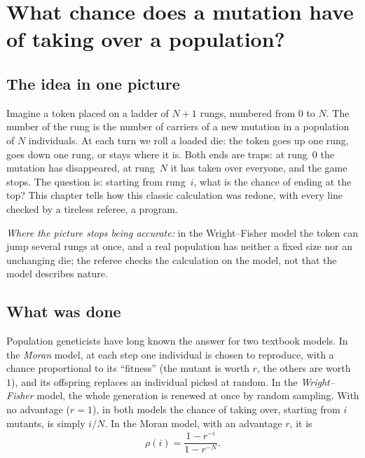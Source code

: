 \chapter[A mutation's chance of taking over]{What chance does a mutation have of taking over a population?}

\section*{The idea in one picture}

\begin{analogie}
Imagine a token placed on a ladder of $N+1$ rungs, numbered from $0$ to $N$. The number of the rung is the number
of carriers of a new mutation in a population of $N$ individuals. At each turn we roll a loaded die: the token
goes up one rung, goes down one rung, or stays where it is. Both ends are traps: at rung~$0$ the mutation has
disappeared, at rung~$N$ it has taken over everyone, and the game stops. The question is: starting from rung~$i$,
what is the chance of ending at the top? This chapter tells how this classic calculation was redone, with every
line checked by a tireless referee, a program.

\emph{Where the picture stops being accurate:} in the Wright--Fisher model the token can jump several rungs at
once, and a real population has neither a fixed size nor an unchanging die; the referee checks the calculation
on the model, not that the model describes nature.
\end{analogie}

\section*{What was done}

Population geneticists have long known the answer for two textbook models. In the \emph{Moran} model, at each step
one individual is chosen to reproduce, with a chance proportional to its ``fitness'' (the mutant is worth $r$, the
others are worth~$1$), and its offspring replaces an individual picked at random. In the \emph{Wright--Fisher}
model, the whole generation is renewed at once by random sampling. With no advantage ($r=1$), in both models the
chance of taking over, starting from $i$ mutants, is simply $i/N$. In the Moran model, with an advantage $r$, it is
\[
\rho(i)=\frac{1-r^{-i}}{1-r^{-N}} .
\]

